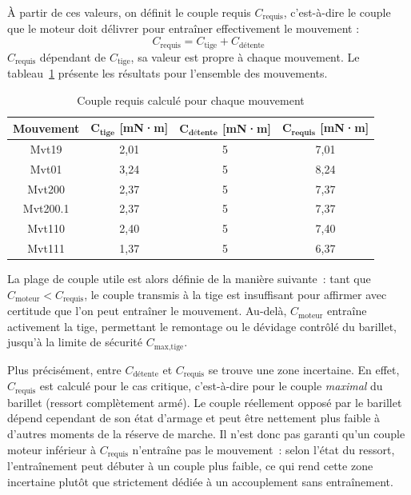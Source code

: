 À partir de ces valeurs, on définit le couple requis $C_{\text{requis}}$,
c'est-à-dire le couple que le moteur doit délivrer pour entraîner
effectivement le mouvement :
\begin{equation}
    C_{\text{requis}} = C_{\text{tige}} + C_{\text{détente}}
    \label{eq:couple_requis_def}
\end{equation}
\noindent $C_{\text{requis}}$ dépendant de $C_{\text{tige}}$, sa valeur est propre à chaque mouvement. Le tableau~\ref{tab:couple_requis} présente les résultats pour l'ensemble des mouvements.

\begin{table}[H]
  \centering
  \caption{Couple requis calculé pour chaque mouvement}
  \label{tab:couple_requis}
  \begin{tabular}{|c|c|c|c|}
    \hline
    \textbf{Mouvement} & $\boldsymbol{C_{\text{tige}}}$ \textbf{[mN·m]} & $\boldsymbol{C_{\text{détente}}}$ \textbf{[mN·m]} & $\boldsymbol{C_{\text{requis}}}$ \textbf{[mN·m]} \\
    \hline
    Mvt19    & 2,01 & 5 & 7,01 \\
    Mvt01    & 3,24 & 5 & 8,24 \\
    Mvt200   & 2,37 & 5 & 7,37 \\
    Mvt200.1 & 2,37 & 5 & 7,37 \\
    Mvt110   & 2,40 & 5 & 7,40 \\
    Mvt111   & 1,37 & 5 & 6,37 \\
    \hline
  \end{tabular}
\end{table}

La plage de couple utile est alors définie de la manière suivante~: tant que
$C_{\text{moteur}} < C_{\text{requis}}$, le couple transmis à la tige est
insuffisant pour affirmer avec certitude que l'on peut entraîner le
mouvement. Au-delà, $C_{\text{moteur}}$ entraîne activement la tige,
permettant le remontage ou le dévidage contrôlé du barillet, jusqu'à la
limite de sécurité $C_{\text{max,tige}}$.

Plus précisément, entre $C_{\text{détente}}$ et $C_{\text{requis}}$ se
trouve une zone incertaine. En effet, $C_{\text{requis}}$ est
calculé pour le cas critique, c'est-à-dire pour le couple \emph{maximal} du
barillet (ressort complètement armé). Le couple réellement opposé par le
barillet dépend cependant de son état d'armage et peut être nettement plus
faible à d'autres moments de la réserve de marche. Il n'est donc pas garanti
qu'un couple moteur inférieur à $C_{\text{requis}}$ n'entraîne pas le
mouvement~: selon l'état du ressort, l'entraînement peut débuter à un couple
plus faible, ce qui rend cette zone incertaine plutôt que strictement dédiée
à un accouplement sans entraînement.

